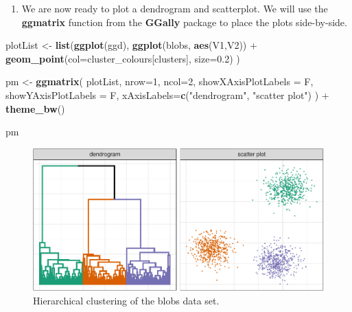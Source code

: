 \documentclass[]{book}
\newenvironment{Shaded}{\begin{snugshade}}{\end{snugshade}}
\newcommand{\KeywordTok}[1]{\textcolor[rgb]{0.13,0.29,0.53}{\textbf{{#1}}}}
\newcommand{\DataTypeTok}[1]{\textcolor[rgb]{0.13,0.29,0.53}{{#1}}}
\newcommand{\DecValTok}[1]{\textcolor[rgb]{0.00,0.00,0.81}{{#1}}}
\newcommand{\FloatTok}[1]{\textcolor[rgb]{0.00,0.00,0.81}{{#1}}}
\newcommand{\StringTok}[1]{\textcolor[rgb]{0.31,0.60,0.02}{{#1}}}
\newcommand{\NormalTok}[1]{{#1}}
\providecommand{\tightlist}{%
  \setlength{\itemsep}{0pt}\setlength{\parskip}{0pt}}
\theoremstyle{definition}
\theoremstyle{definition}
\theoremstyle{definition}
\theoremstyle{remark}
\begin{document}
\begin{enumerate}
\def\labelenumi{\arabic{enumi}.}
\setcounter{enumi}{11}
\tightlist
\item
  We are now ready to plot a dendrogram and scatterplot. We will use the
  \textbf{ggmatrix} function from the \textbf{GGally} package to place
  the plots side-by-side.
\end{enumerate}

\begin{Shaded}
\begin{Highlighting}[]
\NormalTok{plotList <-}\StringTok{ }\KeywordTok{list}\NormalTok{(}\KeywordTok{ggplot}\NormalTok{(ggd),}
                 \KeywordTok{ggplot}\NormalTok{(blobs, }\KeywordTok{aes}\NormalTok{(V1,V2)) +}\StringTok{ }
\StringTok{                   }\KeywordTok{geom_point}\NormalTok{(}\DataTypeTok{col=}\NormalTok{cluster_colours[clusters], }\DataTypeTok{size=}\FloatTok{0.2}\NormalTok{)}
                 \NormalTok{)}

\NormalTok{pm <-}\StringTok{ }\KeywordTok{ggmatrix}\NormalTok{(}
  \NormalTok{plotList, }\DataTypeTok{nrow=}\DecValTok{1}\NormalTok{, }\DataTypeTok{ncol=}\DecValTok{2}\NormalTok{, }\DataTypeTok{showXAxisPlotLabels =} \NormalTok{F, }\DataTypeTok{showYAxisPlotLabels =} \NormalTok{F, }
  \DataTypeTok{xAxisLabels=}\KeywordTok{c}\NormalTok{(}\StringTok{"dendrogram"}\NormalTok{, }\StringTok{"scatter plot"}\NormalTok{)}
\NormalTok{) +}\StringTok{ }\KeywordTok{theme_bw}\NormalTok{()}

\NormalTok{pm}
\end{Highlighting}
\end{Shaded}

\begin{figure}

{\centering \includegraphics[width=0.8\linewidth]{09-clustering_files/figure-latex/hclustBlobs-1} 

}

\caption{Hierarchical clustering of the blobs data set.}\label{fig:hclustBlobs}
\end{figure}
\end{document}

